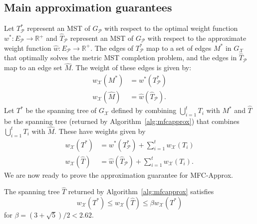\subsection{Main approximation guarantees}
Let $T^*_\mathcal{P}$ represent an MST of $G_\mathcal{P}$ with respect to the optimal weight function $w^* \colon E_\mathcal{P} \rightarrow \mathbb{R}^+$ and $\hat{T}_\mathcal{P}$ represent an MST of $G_\mathcal{P}$ with respect to the approximate weight function $\hat{w} \colon E_\mathcal{P} \rightarrow \mathbb{R}^+$. The edges of $T^*_\mathcal{P}$ map to a set of edges $M^*$ in $G_\mathcal{X}$ that optimally solves the metric MST completion problem, and the edges in $\hat{T}_\mathcal{P}$ map to an edge set $\hat{M}$. The weight of these edges is given by:
\begin{align*}
	w_\mathcal{X}(M^*) &= w^*(T^*_\mathcal{P}) \\
	w_\mathcal{X}(\hat{M}) &= \hat{w}(\hat{T}_\mathcal{P}).
\end{align*}
Let $T^*$ be the spanning tree of $G_\mathcal{X}$ defined by combining $\bigcup_{i = 1}^t T_i$ with $M^*$ and $\hat{T}$ be the spanning tree (returned by Algorithm~\ref{alg:mfcapprox}) that combines $\bigcup_{i = 1}^t T_i$ with $\hat{M}$. These have weights given by
\begin{align}
	\label{eq:Tstar}
	w_\mathcal{X}(T^*) &= w^*(T_\mathcal{P}^*) +  \sum_{i = 1}^t w_\mathcal{X}(T_i) \\
	\label{eq:That}
	w_\mathcal{X}(\hat{T}) &= \hat{w}(\hat{T}_\mathcal{P}) +  \sum_{i = 1}^t w_\mathcal{X}(T_i) .
\end{align}
We are now ready to prove the approximation guarantee for \textsf{MFC-Approx}.
\begin{theorem}
	\label{thm:main}
	The spanning tree $\hat{T}$ returned by Algorithm~\ref{alg:mfcapprox} satisfies
	\begin{equation*}
		w_\mathcal{X}(T^*) \leq w_\mathcal{X}(\hat{T}) \leq \beta w_\mathcal{X}(T^*)
	\end{equation*}
	for $\beta = (3 + \sqrt{5})/2 < 2.62$. 
\end{theorem}
